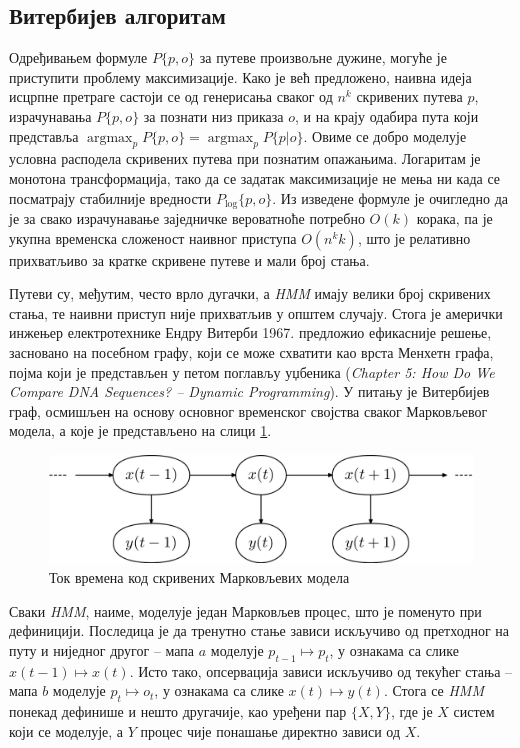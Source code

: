 \documentclass[12pt,oneside]{memoir}
\begin{document}
\begin{CJK}{UTF8}{ipxm}
\section{Витербијев алгоритам}
Одређивањем формуле $P\{p, o\}$ за путеве произвољне дужине, могуће је приступити проблему максимизације. Како је већ предложено, наивна идеја исцрпне претраге састоји се од генерисања сваког од $n^k$ скривених путева $p$, израчунавања $P\{p, o\}$ за познати низ приказа $o$, и на крају одабира пута који представља $\operatorname*{argmax}_p P\{p, o\} = \operatorname*{argmax}_p P\{p | o\}$. Овиме се добро моделује условна расподела скривених путева при познатим опажањима. Логаритам је монотона трансформација, тако да се задатак максимизације не мења ни када се посматрају стабилније вредности $P_{\log}\{p, o\}$. Из изведене формуле је очигледно да је за свако израчунавање заједничке вероватноће потребно $O(k)$ корака, па је укупна временска сложеност наивног приступа $O(n^k k)$, што је релативно прихватљиво за кратке скривене путеве и мали број стања.

Путеви су, међутим, често врло дугачки, а \textit{HMM} имају велики број скривених стања, те наивни приступ није прихватљив у општем случају. Стога је амерички инжењер електротехнике Ендру Витерби 1967. предложио ефикасније решење\cite{viterbi1967}, засновано на посебном графу, који се може схватити као врста Менхетн графа, појма који је представљен у петом поглављу уџбеника (\textit{Chapter 5: How Do We Compare DNA Sequences? -- Dynamic Programming}). У питању је Витербијев граф, осмишљен на основу основног временског својства сваког Марковљевог модела, а које је представљено на слици \ref{fig:vreme}.

\begin{figure}[!ht]
  \centering
  \includegraphics[width=.85\textwidth]{vreme.png}
  \caption{Ток времена код скривених Марковљевих модела\cite{vreme}}
  \label{fig:vreme}
\end{figure}

Сваки \textit{HMM}, наиме, моделује један Марковљев процес, што је поменуто при дефиницији. Последица је да тренутно стање зависи искључиво од претходног на путу и ниједног другог -- мапа $a$ моделује $p_{t-1} \mapsto p_t$, у ознакама са слике $x(t-1) \mapsto x(t)$. Исто тако, опсервација зависи искључиво од текућег стања -- мапа  $b$ моделује $p_t \mapsto o_t$, у ознакама са слике $x(t) \mapsto y(t)$. Стога се \textit{HMM} понекад дефинише и нешто другачије, као уређени пар $\{X, Y\}$, где је $X$ систем који се моделује, а $Y$ процес чије понашање директно зависи од $X$.


\end{CJK}
\end{document}
